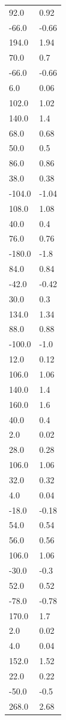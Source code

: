 \begin{longtable}{ll}
92.0 & 0.92 \\
-66.0 & -0.66 \\
194.0 & 1.94 \\
70.0 & 0.7 \\
-66.0 & -0.66 \\
6.0 & 0.06 \\
102.0 & 1.02 \\
140.0 & 1.4 \\
68.0 & 0.68 \\
50.0 & 0.5 \\
86.0 & 0.86 \\
38.0 & 0.38 \\
-104.0 & -1.04 \\
108.0 & 1.08 \\
40.0 & 0.4 \\
76.0 & 0.76 \\
-180.0 & -1.8 \\
84.0 & 0.84 \\
-42.0 & -0.42 \\
30.0 & 0.3 \\
134.0 & 1.34 \\
88.0 & 0.88 \\
-100.0 & -1.0 \\
12.0 & 0.12 \\
106.0 & 1.06 \\
140.0 & 1.4 \\
160.0 & 1.6 \\
40.0 & 0.4 \\
2.0 & 0.02 \\
28.0 & 0.28 \\
106.0 & 1.06 \\
32.0 & 0.32 \\
4.0 & 0.04 \\
-18.0 & -0.18 \\
54.0 & 0.54 \\
56.0 & 0.56 \\
106.0 & 1.06 \\
-30.0 & -0.3 \\
52.0 & 0.52 \\
-78.0 & -0.78 \\
170.0 & 1.7 \\
2.0 & 0.02 \\
4.0 & 0.04 \\
152.0 & 1.52 \\
22.0 & 0.22 \\
-50.0 & -0.5 \\
268.0 & 2.68 \\

\end{longtable}
